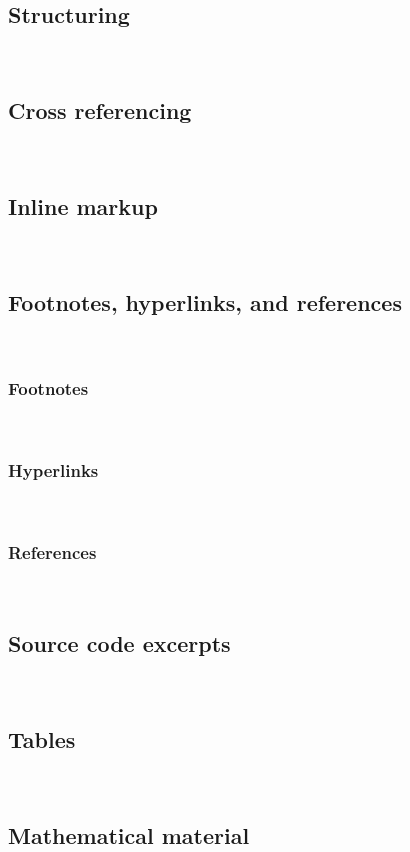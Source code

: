 \documentclass[12pt,openany]{book}
\begin{document}
\subsection{Structuring}

~

\subsection{Cross referencing}

~

\subsection{Inline markup}

~

\subsection{Footnotes, hyperlinks, and references}

~

\subsubsection{Footnotes}

~

\subsubsection{Hyperlinks}

~

\subsubsection{References}

~

\subsection{Source code excerpts}

~

\subsection{Tables}

~

\subsection{Mathematical material}
\end{document}

